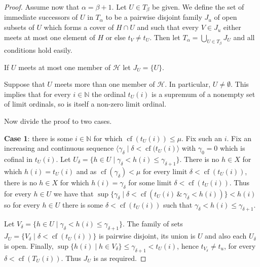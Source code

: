 \documentclass{amsart}
\theoremstyle{remark}
\DeclareMathOperator{\cf}{cf}
\renewcommand\mid{\mathrel{|}\allowbreak}
\begin{document}
\begin{proof}
        Assume now that \(\alpha=\beta+1\). Let \(U\in T_\beta\) be given. We define the set of
        immediate successors of \(U\) in \(T_{\alpha}\) to be a pairwise disjoint
        family \(J_{u}\) of open subsets of \(U\) which forms a cover of \(H\cap U\) and such
        that every \(V\in J_{u}\) either meets at most one element of \(H\)
        or else \(t_{V}\not=t_{U}\). Then let \(T_{\alpha}=\bigcup_{U\in T_{\beta}}J_{U}\)
        and all conditions hold easily.

        If \(U\) meets at most one  member of \(\mathcal H\) let
        \(J_{U}=\{U\}\).

        Suppose that \(U\) meets more than one member of \(\mathcal H\).
        In particular, \(U\not=\emptyset\).
       This implies that for every
        \(i\in \mathbb N\) the ordinal \(t_{U}(i)\) is a supremum of a nonempty set of
        limit ordinals, so is itself a non-zero limit ordinal.


        Now divide the proof to two cases.

        \medskip\noindent
        \textbf{Case 1}: there is some \(i\in \mathbb N\) for which
        \(\cf(t_{U}(i))\le \mu\). Fix such
        an \(i\). Fix an increasing and continuous
        sequence \(\langle \gamma_{\delta}\mid\delta<\cf(t_{U}(i)\rangle\) with \(\gamma_{0}=0\)  which is cofinal
        in \(t_{U}(i)\).
        Let
        \(U_{\delta}=\{h\in U\mid \gamma_{\delta}<h(i)\le \gamma_{\delta+1}\}\). There is no \(h\in X\) for which
        \(h(i)=t_{U}(i)\) and as \(\cf(\gamma_{\delta})< \mu\) for every limit
        \(\delta<\cf(t_{U}(i))\), there is no \(h\in X\) for which \(h(i)=\gamma_{\delta}\) for
        some
        limit \(\delta<\cf(t_{U}(i))\). Thus for every \(h\in U\) we have that
        \(\sup\{\gamma_{\delta}\mid \delta<\cf(t_{U}(i)\,\&\,\gamma_{\delta}<h(i))\}<h(i)\) so for every
        \(h\in U\) there is some \(\delta<\cf(t_{U}(i))\) such that
        \(\gamma_{\delta}<h(i)\le \gamma_{\delta+1}\).

        Let \(V_{\delta}=\{h\in U\mid \gamma_{\delta}<h(i)\le \gamma_{\delta+1}\}\).
        The family of sets \(J_{U}=\{V_{\delta}\mid \delta<\cf(t_{U}(i))\}\) is pairwise
        disjoint, its union is \(U\) and also each \(U_{\delta}\) is open.
          Finally, \(\sup \{h(i)\mid h\in V_{\delta}\}\le \gamma_{\delta+1}<t_{U}(i)\), hence \(t_{V_{\delta}}\not=t_{u}\), for every
          \(\delta<\cf(T_{U}(i))\). Thus \(J_{U}\) is as required.



\end{proof}
\end{document}
